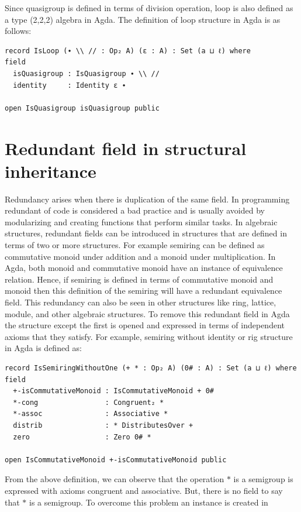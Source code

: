 Since quasigroup is defined in terms of division operation, loop is also defined
as a type (2,2,2) algebra in Agda. The definition of loop structure in Agda is
as follows:

\begin{verbatim}
record IsLoop (∙ \\ // : Op₂ A) (ε : A) : Set (a ⊔ ℓ) where
field
  isQuasigroup : IsQuasigroup ∙ \\ //
  identity     : Identity ε ∙

open IsQuasigroup isQuasigroup public
\end{verbatim}

\section{Redundant field in structural inheritance}
Redundancy arises when there is duplication of the same field. In programming
redundant of code is considered a bad practice and is usually avoided by
modularizing and creating functions that perform similar tasks. In algebraic
structures, redundant fields can be introduced in structures that are defined in
terms of two or more structures. For example semiring can be defined as
commutative monoid under addition and a monoid under multiplication. In Agda,
both monoid and commutative monoid have an instance of equivalence relation.
Hence, if semiring is defined in terms of commutative monoid and monoid then
this definition of the semiring will have a redundant equivalence field. This
redundancy can also be seen in other structures like ring, lattice, module, and
other algebraic structures. To remove this redundant field in Agda the structure
except the first is opened and expressed in terms of independent axioms that
they satisfy. For example, semiring without identity or rig structure in Agda is
defined as:
\begin{verbatim}
record IsSemiringWithoutOne (+ * : Op₂ A) (0# : A) : Set (a ⊔ ℓ) where
field
  +-isCommutativeMonoid : IsCommutativeMonoid + 0#
  *-cong                : Congruent₂ *
  *-assoc               : Associative *
  distrib               : * DistributesOver +
  zero                  : Zero 0# *

open IsCommutativeMonoid +-isCommutativeMonoid public
\end{verbatim}
From the above definition, we can observe that the operation $*$ is a semigroup
is expressed with axioms congruent and associative. But, there is no field to
say that $*$ is a semigroup. To overcome this problem an instance is created in
